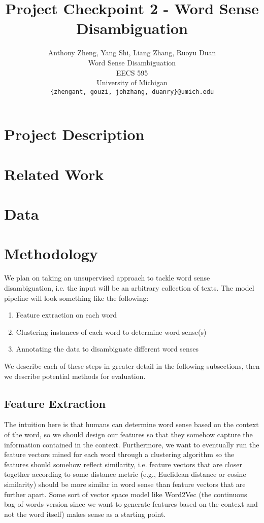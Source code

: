 \documentclass[11pt,letterpaper]{article}
\title{Project Checkpoint 2 - Word Sense Disambiguation}
\author{Anthony Zheng, Yang Shi, Liang Zhang, Ruoyu Duan\\
      Word Sense Disambiguation\\
      EECS 595\\
	    University of Michigan\\
	    {\tt \{zhengant, gouzi, johzhang, duanry\}@umich.edu}
}
\date{}
\begin{document}
\maketitle

\section{Project Description}
\section{Related Work}
\section{Data}
\section{Methodology}
We plan on taking an unsupervised approach to tackle word sense disambiguation, i.e. the input will be an arbitrary collection of texts. The model pipeline will look something like the following:
\begin{enumerate}
  \item Feature extraction on each word
  \item Clustering instances of each word to determine word sense(s)
  \item Annotating the data to disambiguate different word senses
\end{enumerate}

We describe each of these steps in greater detail in the following subsections, then we describe potential methods for evaluation.

\subsection{Feature Extraction}
The intuition here is that humans can determine word sense based on the context of the word, so we should design our features so that they somehow capture the information contained in the context. Furthermore, we want to eventually run the feature vectors mined for each word through a clustering algorithm so the features should somehow reflect similarity, i.e. feature vectors that are closer together according to some distance metric (e.g., Euclidean distance or cosine similarity) should be more similar in word sense than feature vectors that are further apart. Some sort of vector space model like Word2Vec (the continuous bag-of-words version since we want to generate features based on the context and not the word itself) makes sense as a starting point. 
\end{document}
